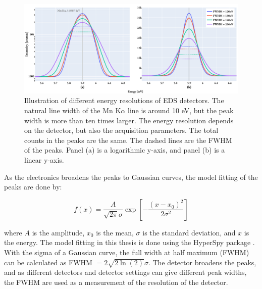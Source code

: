 \begin{figure}[ht]
    \centering
    \includegraphics[width=0.95\linewidth]{figures/eds_energyResolutionsMnKa.pdf}
    \caption{
        Illustration of different energy resolutions of EDS detectors.
        The natural line width of the Mn K$\alpha$ line is around 10 eV, but the peak width is more than ten times larger.
        The energy resolution depends on the detector, but also the acquisition parameters.
        The total counts in the peaks are the same.
        The dashed lines are the FWHM of the peaks.
        Panel (a) is a logarithmic y-axis, and panel (b) is a linear y-axis.
    }
    \label{fig:theory:energy_resolution}
\end{figure}





As the electronics broadens the peaks to Gaussian curves, the model fitting of the peaks are done by:

\begin{equation}
    \label{eq:gaussian}
    f(x) = \frac{A}{\sqrt{2\pi}\sigma}\exp\left[{-\frac{(x-x_0)^2}{2\sigma^2}}\right]
\end{equation}

where $A$ is the amplitude, $x_0$ is the mean, $\sigma$ is the standard deviation, and $x$ is the energy.
The model fitting in this thesis is done using the HyperSpy package \cite{hyperspy_1.7.1}.
With the sigma of a Gaussian curve, the full width at half maximum (FWHM) can be calculated as FWHM $= 2\sqrt{2\ln(2)}\sigma$.
The detector broadens the peaks, and as different detectors and detector settings can give different peak widths, the FWHM are used as a measurement of the resolution of the detector.




